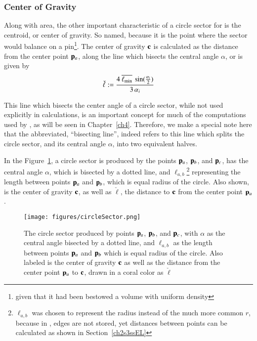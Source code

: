 %
\subsubsection{Center of Gravity}
\label{ch2sBssGsssCG}
Along with area, the other important characteristic of a circle sector for  is the centroid, or center of gravity. So named, because it is the point where the sector would balance on a pin\footnote{given that it had been bestowed a volume with uniform density}. The center of gravity $\mathbf{c}$ is calculated as the distance from the center point $\mathbf{p}_a$, along the line which bisects the central angle $\alpha$, or is given by
%
\begin{equation}
	\check{\ell} := \frac{4\:\overline{\ell_\text{min}}\:\sin(\frac{\alpha_i}{2})}{3\,\alpha_i}
	\label{eq:ch2distToCoG}
\end{equation}%
%
%

This line which bisects the center angle of a circle sector, while not used explicitly in calculations, is an important concept for much of the computations used by , as will be seen in Chapter~\ref{ch4}. Therefore, we make a special note here that the abbreviated, ``bisecting line'', indeed refers to this line which splits the circle sector, and its central angle $\alpha$, into two equivalent halves.%
%

In the Figure~\ref{fig:circleSector}, a circle sector is produced by the points $\mathbf{p}_a$, $\mathbf{p}_b$, and $\mathbf{p}_c$, has the central angle $\alpha$, which is bisected by a dotted line, and $\ell_{a,b}$\footnote{$\ell_{a,b}$ was chosen to represent the radius instead of the much more common $r$, because in \tdd{}, edges are not stored, yet distances between points can be calculated as shown in Section~\ref{ch2s3ssEL}} representing the length between points $\mathbf{p}_a$ and $\mathbf{p}_b$, which is equal radius of the circle. Also shown, is the center of gravity $\mathbf{c}$, as well as $\check{\ell}$, the distance to $\mathbf{c}$ from the center point $\mathbf{p}_a$.

\begin{figure}
\ffigbox
	{\texttt{[image: figures/circleSector.png]}}
	{\caption[A Circle Sector in Detail]{The circle sector produced by points $\mathbf{p}_a$, $\mathbf{p}_b$, and $\mathbf{p}_c$, with $\alpha$ as the central angle bisected by a dotted line, and $\ell_{a,b}$ as the length between points $\mathbf{p}_a$ and $\mathbf{p}_b$ which is equal radius of the circle. Also labeled is the center of gravity $\mathbf{c}$ as well as the distance from the center point $\mathbf{p}_a$ to $\mathbf{c}$, drawn in a coral color as $\check{\ell}$}\label{fig:circleSector}}
\end{figure}

